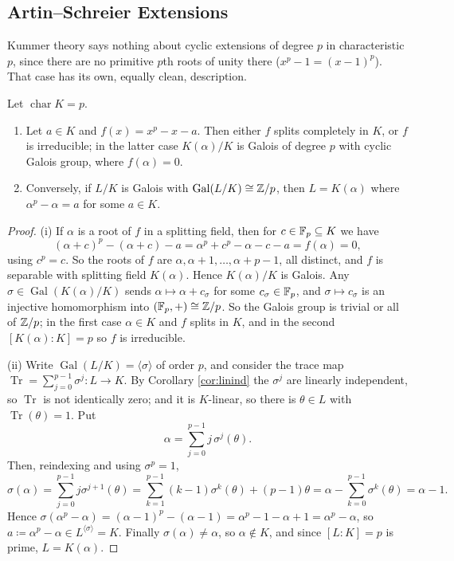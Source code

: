 \documentclass[a4paper]{scrartcl}
\newcommand{\charr}{\operatorname{char}}
\newcommand{\Gal}{\operatorname{Gal}}
\newcommand{\Tr}{\operatorname{Tr}}
\begin{document}
\subsection{Artin--Schreier Extensions}

Kummer theory says nothing about cyclic extensions of degree $p$ in characteristic $p$, since there are no primitive $p$th roots of unity there ($x^p-1 = (x-1)^p$). That case has its own, equally clean, description.

\begin{theorem}\label{thm:artinschreier}
	Let $\charr K = p$.
	\begin{enumerate}[label=(\roman*)]
		\item Let $a \in K$ and $f(x) = x^p - x - a$. Then either $f$ splits completely in $K$, or $f$ is irreducible; in the latter case $K(\alpha)/K$ is Galois of degree $p$ with cyclic Galois group, where $f(\alpha)=0$.
		\item Conversely, if $L/K$ is Galois with $\Gal(L/K) \cong \Z/p$, then $L = K(\alpha)$ where $\alpha^p - \alpha = a$ for some $a \in K$.
	\end{enumerate}
\end{theorem}

\begin{proof}
	(i) If $\alpha$ is a root of $f$ in a splitting field, then for $c \in \mathbb{F}_p \subseteq K$ we have
	$$(\alpha+c)^p - (\alpha+c) - a = \alpha^p + c^p - \alpha - c - a = f(\alpha) = 0,$$
	using $c^p = c$. So the roots of $f$ are $\alpha, \alpha+1, \dots, \alpha+p-1$, all distinct, and $f$ is separable with splitting field $K(\alpha)$. Hence $K(\alpha)/K$ is Galois. Any $\sigma \in \Gal(K(\alpha)/K)$ sends $\alpha \mapsto \alpha + c_\sigma$ for some $c_\sigma \in \mathbb{F}_p$, and $\sigma \mapsto c_\sigma$ is an injective homomorphism into $(\mathbb{F}_p,+) \cong \mathbb{Z}/p$. So the Galois group is trivial or all of $\mathbb{Z}/p$; in the first case $\alpha \in K$ and $f$ splits in $K$, and in the second $[K(\alpha):K] = p$ so $f$ is irreducible.

	(ii) Write $\Gal(L/K) = \langle\sigma\rangle$ of order $p$, and consider the trace map $\Tr = \sum_{j=0}^{p-1}\sigma^j : L \to K$. By Corollary \ref{cor:linind} the $\sigma^j$ are linearly independent, so $\Tr$ is not identically zero; and it is $K$-linear, so there is $\theta \in L$ with $\Tr(\theta) = 1$. Put
	$$\alpha = \sum_{j=0}^{p-1}j\,\sigma^j(\theta).$$
	Then, reindexing and using $\sigma^p = 1$,
	$$\sigma(\alpha) = \sum_{j=0}^{p-1}j\sigma^{j+1}(\theta) = \sum_{k=1}^{p-1}(k-1)\sigma^k(\theta)+(p-1)\theta = \alpha - \sum_{k=0}^{p-1}\sigma^k(\theta) = \alpha - 1.$$
	Hence $\sigma(\alpha^p-\alpha) = (\alpha-1)^p - (\alpha-1) = \alpha^p - 1 - \alpha + 1 = \alpha^p-\alpha$, so $a \coloneqq \alpha^p - \alpha \in L^{\langle\sigma\rangle} = K$. Finally $\sigma(\alpha) \neq \alpha$, so $\alpha \notin K$, and since $[L:K] = p$ is prime, $L = K(\alpha)$.
\end{proof}
\end{document}
